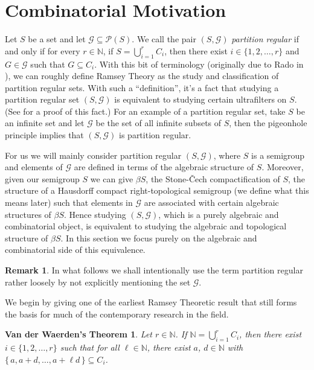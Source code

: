 \documentclass[12pt]{article}
\theoremstyle{plain}
\newtheorem*{vdw}{Van der Waerden's Theorem}
\theoremstyle{definition}
\newtheorem{rmk}[thm]{Remark}
\newcommand{\bbN}{\mathbb{N}}
\newcommand{\calG}{\mathcal{G}}
\newcommand{\calP}{\mathcal{P}}
\begin{document}
\section{Combinatorial Motivation} 
Let $S$ be a set and let $\calG \subseteq \calP(S)$.
We call the pair $(S, \calG)$ \textsl{partition regular} if and only
if for every $r \in \bbN$, if $S = \bigcup_{i=1}^r C_i$, then there
exist $i \in \{1, 2, \ldots, r\}$ and $G \in \calG$ such that $G
\subseteq C_i$. 
With this bit of terminology (originally due to Rado in
\cite{Rado:1945kx}), we can roughly define Ramsey Theory as the
  study and classification of partition regular sets. 
With such a ``definition'', it's a fact that studying a partition
regular set $(S, \calG)$ is equivalent to studying certain ultrafilters on
$S$. 
(See \cite[Theorem 5.7]{Hindman:1998fk} for a proof of this fact.)
For an example of a partition regular set, take $S$ be an infinite set
and let $\calG$ be the set of all infinite subsets of $S$, then the
pigeonhole principle implies that $(S, \calG)$ is partition regular.

For us we will mainly consider partition regular $(S, \calG)$, where
$S$ is a semigroup and elements of $\calG$ are defined in terms of the
algebraic structure of $S$.
Moreover, given our semigroup $S$ we can give $\beta S$,
the Stone-\v{C}ech compactification of $S$, the structure of a Hausdorff
compact right-topological semigroup (we define what this means later)
such that elements in $\calG$ are associated with certain algebraic
structures of $\beta S$. 
Hence studying $(S, \calG)$, which is a purely algebraic and
combinatorial object, is equivalent to studying the algebraic and
topological structure of $\beta S$. 
In this section we focus purely on the algebraic and combinatorial
side of this equivalence.

\begin{rmk}
  In what follows we shall intentionally use the term partition
  regular rather loosely by not explicitly mentioning the set
  $\calG$. 
\end{rmk}


We begin by giving one of the earliest Ramsey Theoretic result that
still forms the basis for much of the contemporary research in the
field.

\begin{vdw}
  Let $r \in \bbN$.
  If $\bbN = \bigcup_{i=1}^r C_i$, then there exist $i \in \{1, 2,
  \ldots, r\}$ such that for all $\ell \in \bbN$, there exist $a$, $d
  \in \bbN$ with $\{\, a, a+d, \ldots, a+\ell d \,\} \subseteq C_i$. 
\end{vdw}
\end{document}
